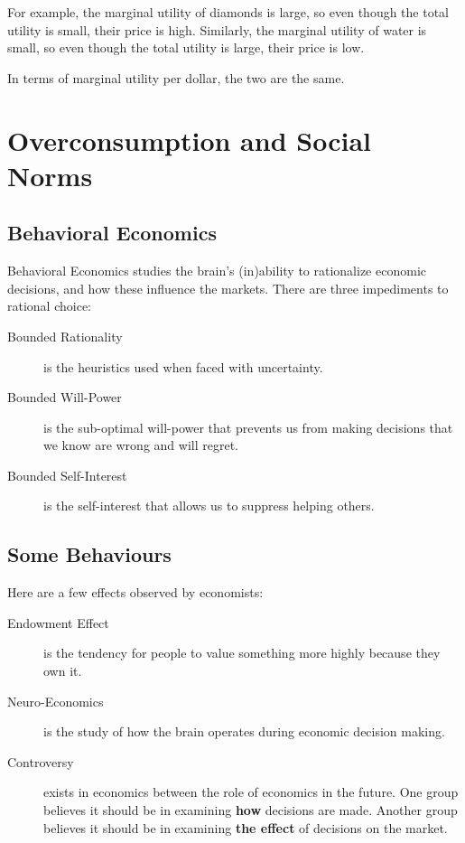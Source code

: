                     For example, the marginal utility of diamonds is large, so even though the total utility is small, their price is high.
                    Similarly, the marginal utility of water is small, so even though the total utility is large, their price is low.

                    In terms of marginal utility per dollar, the two are the same.
            \section{Overconsumption and Social Norms} %
            \label{sec:overconsumption_and_social_norms}
                \subsection{Behavioral Economics} %
                \label{sub:behavioral_economics}
                    Behavioral Economics studies the brain's (in)ability to rationalize economic decisions, and how these influence the markets.
                    There are three impediments to rational choice:
                    \begin{description}
                        \item[Bounded Rationality] is the heuristics used when faced with uncertainty.
                        \item[Bounded Will-Power] is the sub-optimal will-power that prevents us from making decisions that we know are wrong and will regret.
                        \item[Bounded Self-Interest] is the self-interest that allows us to suppress helping others.
                    \end{description}
                \subsection{Some Behaviours} %
                \label{sub:some_behaviours}
                    Here are a few effects observed by economists:
                    \begin{description}
                        \item[Endowment Effect] is the tendency for people to value something more highly because they own it.
                        \item[Neuro-Economics] is the study of how the brain operates during economic decision making.
                        \item[Controversy] exists in economics between the role of economics in the future.
                            One group believes it should be in examining \textbf{how} decisions are made.
                            Another group believes it should be in examining \textbf{the effect} of decisions on the market.
                    \end{description}
